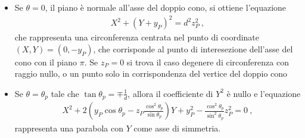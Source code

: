 \documentclass[letterpaper,10pt,italian]{jupyterBook}
\begin{document}
\begin{itemize}
\item {} 
\sphinxAtStartPar
Se \(\theta = 0\), il piano è normale all’asse del doppio cono, si ottiene l’equazione
\begin{equation*}
\begin{split}X^2 + (Y + y_P)^2 = d^2 z_P^2 \ ,\end{split}
\end{equation*}
\sphinxAtStartPar
che rappresenta una circonferenza centrata nel punto di coordinate \((X, Y) = (0, -y_P)\), che corrisponde al punto di interesezione dell’asse del cono con il piano \(\pi\). Se \(z_P = 0\) si trova il caso degenere di circonferenza con raggio nullo, o un punto solo in corrispondenza del vertice del doppio cono

\item {} 
\sphinxAtStartPar
Se \(\theta = \theta_p\) tale che \(\tan \theta_p = \mp \frac{1}{d}\), allora il coefficiente di \(Y^2\) è nullo e l’equazione
\begin{equation*}
\begin{split}X^2 + 2 \left(y_P \cos \theta_p - z_P \frac{\cos^2 \theta_p}{\sin \theta_p} \right) Y + y_P^2 - \frac{\cos^2 \theta_p}{\sin^2 \theta_p} z_P^2 = 0 \ ,\end{split}
\end{equation*}
\sphinxAtStartPar
rappresenta una parabola con \(Y\) come asse di simmetria.

\end{itemize}
\end{document}
